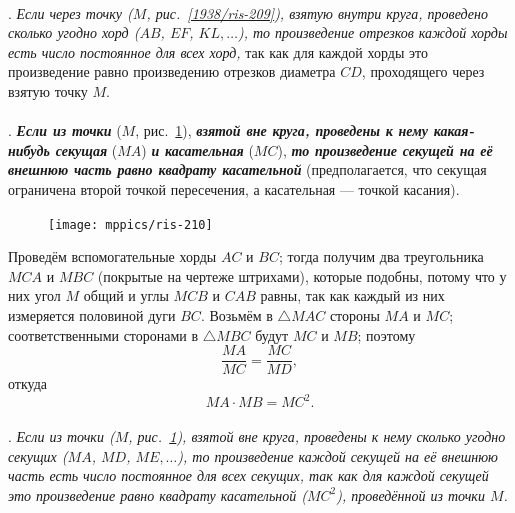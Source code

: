 \documentclass[twoside]{book}
\begin{document}
\paragraph{}\label{1938/200}
.
\emph{Если через точку \emph{($M$, рис.~\ref{1938/ris-209}),} взятую внутри круга, проведено сколько угодно хорд ($AB$, $EF$, $KL,\dots$), то произведение отрезков каждой хорды есть число постоянное для всех хорд,} так как для каждой хорды это произведение равно произведению отрезков диаметра $CD$, проходящего через взятую точку $M$.

\paragraph{}\label{1938/201}
.
\textbf{\emph{Если из точки}} ($M$, рис.~\ref{1938/ris-210}), \textbf{\emph{взятой вне круга, проведены к нему какая-нибудь секущая}} ($MA$) \textbf{\emph{и касательная}} ($MC$), \textbf{\emph{то произведение секущей на её внешнюю часть равно квадрату касательной}} (предполагается, что секущая ограничена второй точкой пересечения, а касательная — точкой касания).

\begin{figure}
\centering
\texttt{[image: mppics/ris-210]}
\caption{}\label{1938/ris-210}
\end{figure}

Проведём вспомогательные хорды $AC$ и $BC$;
тогда получим два треугольника $MCA$ и $MBC$ (покрытые на чертеже штрихами), которые подобны, потому что у них угол $M$ общий и углы $MCB$ и $CAB$ равны, так как каждый из них измеряется половиной дуги $BC$.
Возьмём в $\triangle MAC$ стороны $MA$ и $MC$;
соответственными сторонами в $\triangle MBC$ будут $MC$ и $MB$;
поэтому
\[\frac{MA}{MC} = \frac{MC}{MD},\]
откуда
\[MA\cdot MB=MC^2.\]

{\sloppy

\paragraph{}\label{1938/202}
\mbox{.}
\emph{Если из точки \emph{($M$, рис.~\ref{1938/ris-210}),} взятой вне круга, проведены к нему сколько угодно секущих ($MA$, $MD$, $ME,\dots$), то произведение каждой секущей на её внешнюю часть есть число постоянное для всех секущих, так как для каждой секущей это произведение равно квадрату касательной ($MC^2$), проведённой из точки $M$.}

}

\end{document}
